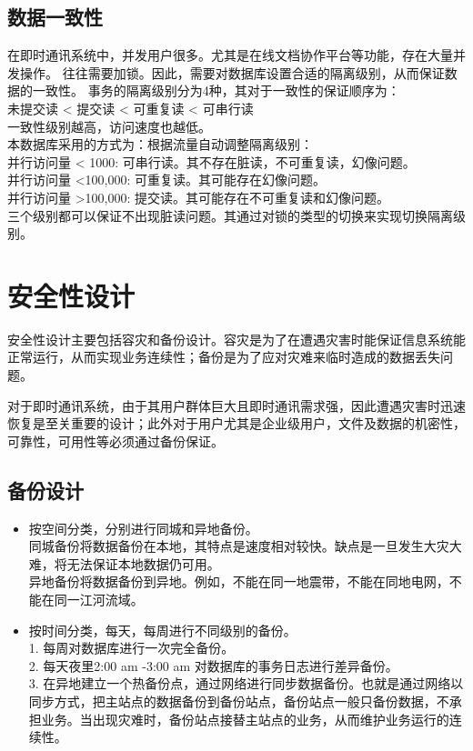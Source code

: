 {\subsection{\color{red} 数据一致性}
在即时通讯系统中，并发用户很多。尤其是在线文档协作平台等功能，存在大量并发操作。
往往需要加锁。因此，需要对数据库设置合适的隔离级别，从而保证数据的一致性。
事务的隔离级别分为4种，其对于一致性的保证顺序为：\\
未提交读 < 提交读 < 可重复读 < 可串行读\\
一致性级别越高，访问速度也越低。\\

本数据库采用的方式为：根据流量自动调整隔离级别：\\
并行访问量 < 1000: 可串行读。其不存在脏读，不可重复读，幻像问题。\\
并行访问量 <100,000: 可重复读。其可能存在幻像问题。\\
并行访问量 >100,000: 提交读。其可能存在不可重复读和幻像问题。\\

三个级别都可以保证不出现脏读问题。其通过对锁的类型的切换来实现切换隔离级别。


}

\newpage

\section{\color{red}安全性设计}
安全性设计主要包括容灾和备份设计。容灾是为了在遭遇灾害时能保证信息系统能正常运行，从而实现业务连续性；备份是为了应对灾难来临时造成的数据丢失问题。

对于即时通讯系统，由于其用户群体巨大且即时通讯需求强，因此遭遇灾害时迅速恢复是至关重要的设计；此外对于用户尤其是企业级用户，文件及数据的机密性，可靠性，可用性等必须通过备份保证。

\subsection{备份设计}
\begin{itemize}
\item 按空间分类，分别进行同城和异地备份。\\
同城备份将数据备份在本地，其特点是速度相对较快。缺点是一旦发生大灾大难，将无法保证本地数据仍可用。 \\

异地备份将数据备份到异地。例如，不能在同一地震带，不能在同地电网，不能在同一江河流域。

\item 按时间分类，每天，每周进行不同级别的备份。\\
1. 每周对数据库进行一次完全备份。\\
2. 每天夜里2:00 am -3:00 am 对数据库的事务日志进行差异备份。\\
3. 在异地建立一个热备份点，通过网络进行同步数据备份。也就是通过网络以同步方式，把主站点的数据备份到备份站点，备份站点一般只备份数据，不承担业务。当出现灾难时，备份站点接替主站点的业务，从而维护业务运行的连续性。\\
\end{itemize}

